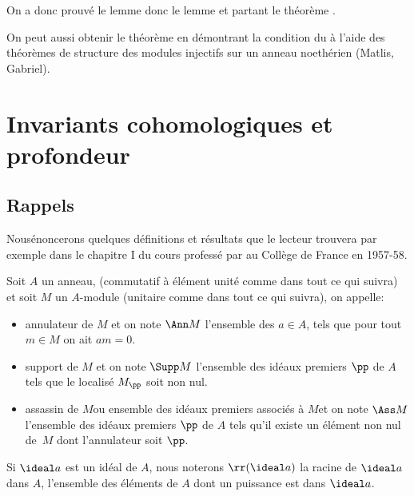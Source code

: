 On a donc prouv\'e le lemme  donc le lemme  et partant le th\'eor\`eme .

\begin{remarquestar}
On peut aussi obtenir le th\'eor\`eme  en d\'emontrant la condition du  \`a l'aide des th\'eor\`emes de structure des modules injectifs sur un anneau noeth\'erien (Matlis, Gabriel).
\end{remarquestar}

\chapter{Invariants cohomologiques et profondeur} \label{III}

\section{Rappels} \label{III.1}

Nous\pageoriginale \'enoncerons quelques d\'efinitions et r\'esultats que le lecteur trouvera par exemple dans le chapitre I du cours profess\'e par  au Coll\`ege de France en 1957-58.

\begin{definition} \label{def:III.1.1}
Soit $A$ un anneau, (commutatif \`a \'el\'ement unit\'e comme dans tout ce qui suivra) et soit $M$ un $A$-module (unitaire comme dans tout ce qui suivra), on appelle:
\begin{itemize}
\item
annulateur de $M$ et on note $\Ann M$ l'ensemble des $a\in A$, tels que pour tout $m\in M$ on ait $am=0$.

\item
support de $M$ et on note $\Supp M$ l'ensemble des id\'eaux premiers $\pp $ de $A$ tels que le localis\'e $M_\pp$ soit non nul.

\item
\og assassin de $M$\fg ou \og ensemble des id\'eaux premiers associ\'es \`a $M$\fg et on note $\Ass M$ l'ensemble des id\'eaux premiers $\pp $ de $A$ tels qu'il existe un \'el\'ement non nul de~$M$ dont l'annulateur soit $\pp $.
\end{itemize}

Si $\ideal a$ est un id\'eal de $A$, nous noterons $\rr(\ideal a)$ la racine de $\ideal a$ dans $A$, \ie l'ensemble des \'el\'ements de $A$ dont un puissance est dans $\ideal a$.
\end{definition}

